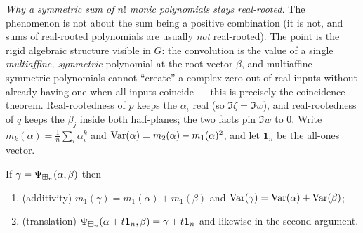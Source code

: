 \noindent\emph{Why a symmetric sum of $n!$ monic polynomials stays real-rooted.}
The phenomenon is not about the sum being a positive combination (it is not, and
sums of real-rooted polynomials are usually \emph{not} real-rooted). The point
is the rigid algebraic structure visible in $G$: the convolution is the value of
a single \emph{multiaffine, symmetric} polynomial at the root vector $\beta$, and
multiaffine symmetric polynomials cannot ``create'' a complex zero out of real
inputs without already having one when all inputs coincide --- this is precisely
the coincidence theorem. Real-rootedness of $p$ keeps the $\alpha_i$ real (so
$\Im\zeta=\Im w$), and real-rootedness of $q$ keeps the $\beta_j$ inside both
half-planes; the two facts pin $\Im w$ to $0$. Write
$m_k(\alpha)=\frac1n\sum_i\alpha_i^k$ and
$\operatorname{Var}(\alpha)=m_2(\alpha)-m_1(\alpha)^2$, and let $\mathbf 1_n$ be the all-ones
vector.

\begin{qfourproposition}\label{prop:props}
If $\gamma=\Psi_{\boxplus_n}(\alpha,\beta)$ then
\begin{enumerate}\setlength\itemsep{2pt}
\item (additivity) $m_1(\gamma)=m_1(\alpha)+m_1(\beta)$ and
$\operatorname{Var}(\gamma)=\operatorname{Var}(\alpha)+\operatorname{Var}(\beta)$;
\item (translation) $\Psi_{\boxplus_n}(\alpha+t\mathbf 1_n,\beta)=\gamma+t\mathbf 1_n$
and likewise in the second argument.
\end{enumerate}
\end{qfourproposition}

